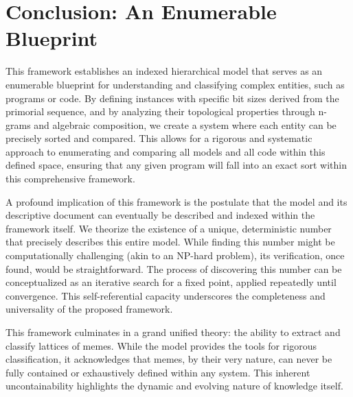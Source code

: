 \section{Conclusion: An Enumerable Blueprint}
This framework establishes an indexed hierarchical model that serves as an enumerable blueprint for understanding and classifying complex entities, such as programs or code. By defining instances with specific bit sizes derived from the primorial sequence, and by analyzing their topological properties through n-grams and algebraic composition, we create a system where each entity can be precisely sorted and compared. This allows for a rigorous and systematic approach to enumerating and comparing all models and all code within this defined space, ensuring that any given program will fall into an exact sort within this comprehensive framework.

A profound implication of this framework is the postulate that the model and its descriptive document can eventually be described and indexed within the framework itself. We theorize the existence of a unique, deterministic number that precisely describes this entire model. While finding this number might be computationally challenging (akin to an NP-hard problem), its verification, once found, would be straightforward. The process of discovering this number can be conceptualized as an iterative search for a fixed point, applied repeatedly until convergence. This self-referential capacity underscores the completeness and universality of the proposed framework.

This framework culminates in a grand unified theory: the ability to extract and classify lattices of memes. While the model provides the tools for rigorous classification, it acknowledges that memes, by their very nature, can never be fully contained or exhaustively defined within any system. This inherent uncontainability highlights the dynamic and evolving nature of knowledge itself.
